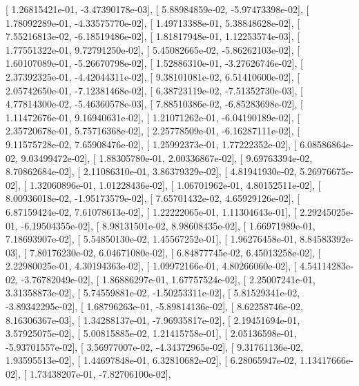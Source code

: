 \documentclass{article}
\begin{document}
       [  1.26815421e-01,  -3.47390178e-03],
       [  5.88984859e-02,  -5.97473398e-02],
       [  1.78092289e-01,  -4.33575770e-02],
       [  1.49713388e-01,   5.38848628e-02],
       [  7.55216813e-02,  -6.18519486e-02],
       [  1.81817948e-01,   1.12253574e-03],
       [  1.77551322e-01,   9.72791250e-02],
       [  5.45082665e-02,  -5.86262103e-02],
       [  1.60107089e-01,  -5.26670798e-02],
       [  1.52886310e-01,  -3.27626746e-02],
       [  2.37392325e-01,  -4.42044311e-02],
       [  9.38101081e-02,   6.51410600e-02],
       [  2.05742650e-01,  -7.12381468e-02],
       [  6.38723119e-02,  -7.51352730e-03],
       [  4.77814300e-02,  -5.46360578e-03],
       [  7.88510386e-02,  -6.85283698e-02],
       [  1.11472676e-01,   9.16940631e-02],
       [  1.21071262e-01,  -6.04190189e-02],
       [  2.35720678e-01,   5.75716368e-02],
       [  2.25778509e-01,  -6.16287111e-02],
       [  9.11575728e-02,   7.65908476e-02],
       [  1.25992373e-01,   1.77222352e-02],
       [  6.08586864e-02,   9.03499472e-02],
       [  1.88305780e-01,   2.00336867e-02],
       [  9.69763394e-02,   8.70862684e-02],
       [  2.11086310e-01,   3.86379329e-02],
       [  4.81941930e-02,   5.26976675e-02],
       [  1.32060896e-01,   1.01228436e-02],
       [  1.06701962e-01,   4.80152511e-02],
       [  8.00936018e-02,  -1.95173579e-02],
       [  7.65701432e-02,   4.65929126e-02],
       [  6.87159424e-02,   7.61078613e-02],
       [  1.22222065e-01,   1.11304643e-01],
       [  2.29245025e-01,  -6.19504355e-02],
       [  8.98131501e-02,   8.98608435e-02],
       [  1.66971989e-01,   7.18693907e-02],
       [  5.54850130e-02,   1.45567252e-01],
       [  1.96276458e-01,   8.84583392e-03],
       [  7.80176230e-02,   6.04671080e-02],
       [  6.84877745e-02,   6.45013258e-02],
       [  2.22980025e-01,   4.30194363e-02],
       [  1.09972166e-01,   4.80266060e-02],
       [  4.54114283e-02,  -3.76782049e-02],
       [  1.86886297e-01,   1.67757524e-02],
       [  2.25007241e-01,   3.31358873e-02],
       [  5.74559881e-02,  -1.50253311e-02],
       [  5.81529341e-02,  -3.89342295e-02],
       [  1.68796263e-01,  -5.89814136e-02],
       [  8.62258746e-02,   8.16306367e-03],
       [  1.34288137e-01,  -7.96935817e-02],
       [  2.19451694e-01,   3.57925075e-02],
       [  5.00815885e-02,   1.21415758e-01],
       [  2.05136598e-01,  -5.93701557e-02],
       [  3.56977007e-02,  -4.34372965e-02],
       [  9.31761136e-02,   1.93595513e-02],
       [  1.44697848e-01,   6.32810682e-02],
       [  6.28065947e-02,   1.13417666e-02],
       [  1.73438207e-01,  -7.82706100e-02],
\end{document}

